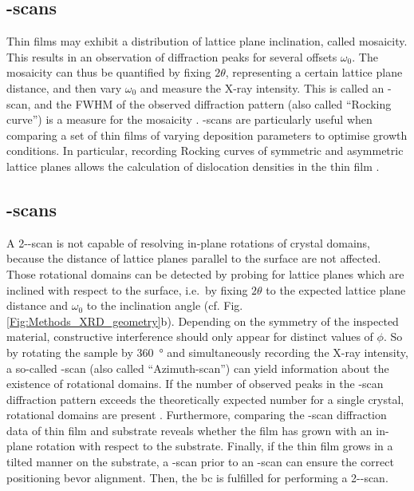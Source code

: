 \subsection{\textomega-scans}
    \label{Sec:Methods_omegaScan}
Thin films may exhibit a distribution of lattice plane inclination, called mosaicity.
This results in an observation of diffraction peaks for several offsets $\omega_0$.
The mosaicity can thus be quantified by fixing $2\theta$, representing a certain lattice plane distance, and then vary $\omega_0$ and measure the X-ray intensity.
This is called an \textomega-scan, and the \gls{FWHM} of the observed diffraction pattern (also called \enquote{Rocking curve}) is a measure for the mosaicity
    \cite{harrington2021}.
\textomega-scans are particularly useful when comparing a set of thin films of varying deposition parameters to optimise growth conditions.
In particular, recording Rocking curves of symmetric and asymmetric lattice planes allows the calculation of dislocation densities in the thin film
    \cite{srikant1997}.
\subsection{\textphi-scans}
    \label{Sec:Methods_phiScan}
A 2\texttheta-\textomega-scan is not capable of resolving in-plane rotations of crystal domains, because the distance of lattice planes parallel to the surface are not affected.
Those rotational domains can be detected by probing for lattice planes which are inclined with respect to the surface, i.e.\ by fixing $2\theta$ to the expected lattice plane distance and $\omega_0$ to the inclination angle (cf. Fig.\,\ref{Fig:Methods_XRD_geometry}b).
Depending on the symmetry of the inspected material, constructive interference should only appear for distinct values of $\phi$.
So by rotating the sample by \qty{360}{\degree} and simultaneously recording the X-ray intensity, a so-called \textphi-scan (also called \enquote{Azimuth-scan}) can yield information about the existence of rotational domains.
If the number of observed peaks in the \textphi-scan diffraction pattern exceeds the theoretically expected number for a single crystal, rotational domains are present
    \cite{harrington2021}.
Furthermore, comparing the \textphi-scan diffraction data of thin film and substrate reveals whether the film has grown with an in-plane rotation with respect to the substrate.
Finally, if the thin film grows in a tilted manner on the substrate, a \textphi-scan prior to an \textomega-scan can ensure the correct positioning bevor alignment.
Then, the \gls{bc} is fulfilled for performing a 2\texttheta-\textomega-scan.

